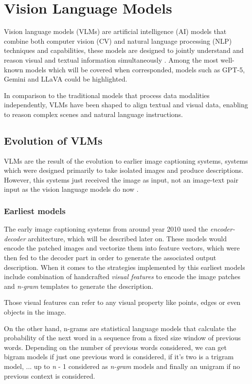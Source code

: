 \section{Vision Language Models}
Vision language models (VLMs) are artificial intelligence (AI) models that combine both computer vision (CV) and natural language processing (NLP) techniques and capabilities, these models are designed to jointly understand and reason visual and textual information simultaneously \cite{bolcato_vlm_2024} \cite{ibm_vlm_2024}. Among the most well-known models which will be covered when corresponded, models such as GPT-5, Gemini and LLaVA could be highlighted.

In comparison to the traditional models that process data modalities independently, VLMs have been shaped to align textual and visual data, enabling to reason complex scenes and natural language instructions.

\subsection{Evolution of VLMs}
VLMs are the result of the evolution to earlier image captioning systems, systems which were designed primarily to take isolated images and produce descriptions. However, this systems just received the image as input, not an image-text pair input as the vision language models do now \cite{wiki:Vision-language_model}.

\subsubsection{Earliest models}
The early image captioning systems from around year 2010 used the \textit{encoder-decoder} architecture, which will be described later on. These models would encode the patched images and vectorize them into feature vectors, which were then fed to the decoder part in order to generate the associated output description. When it comes to the strategies implemented by this earliest models include combination of handcrafted \textit{visual features} to encode the image patches and \textit{n-gram} templates to generate the description. 

Those visual features can refer to any visual property like points, edges or even objects in the image. %

On the other hand, n-grams are statistical language models that calculate the probability of the next word in a sequence from a fixed size window of previous words. Depending on the number of previous words considered, we can get bigram models if just one previous word is considered, if it's two is a trigram model, ... up to \textit{n} - 1 considered as \textit{n-gram} models and finally an unigram if no previous context is considered. 

